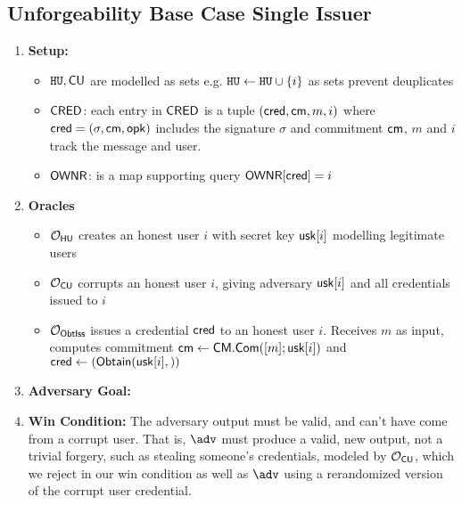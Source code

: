\subsection{Unforgeability Base Case Single Issuer}
\begin{enumerate}
    \item \textbf{Setup:}
    \begin{itemize}
        \item $\mathtt{HU}, \mathsf{CU}$ are modelled as sets e.g. $\mathtt{HU} \gets \mathtt{HU} \cup \{i\}$ as sets prevent deuplicates
        \item $\mathsf{CRED}$: each entry in $\mathsf{CRED}$ is a tuple $(\mathsf{cred}, \mathsf{cm}, m, i)$ where $\mathsf{cred} = (\sigma, \mathsf{cm}, \mathsf{opk})$ includes the signature $\sigma$ and commitment $\mathsf{cm}$, $m$ and $i$ track the message and user. 
        \item $\mathsf{OWNR}$: is a map supporting query $\mathsf{OWNR}[\mathsf{cred}] = i$
    \end{itemize}
    \item \textbf{Oracles}
    \begin{itemize}
        \item $\mathcal{O}_{\mathsf{HU}}$ creates an honest user $i$ with secret key $\mathsf{usk}[i]$ modelling legitimate users
        \item $\mathcal{O}_{\mathsf{CU}}$ corrupts an honest user $i$, giving adversary $\mathsf{usk}[i]$ and all credentials issued to $i$
        \item $\mathcal{O}_{\mathsf{ObtIss}}$ issues a credential $\mathsf{cred}$ to an honest user $i$. Receives $m$ as input, computes commitment $\mathsf{cm} \gets \mathsf{CM.Com}([m]; \mathsf{usk}[i])$ and $\mathsf{cred} \gets (\mathsf{Obtain}(\mathsf{usk}[i],))$
    \end{itemize}
    \item \textbf{Adversary Goal: } 
    \item \textbf{Win Condition: } The adversary output must be valid, and can't have come from a corrupt user. That is,
    $\adv$ must produce a valid, new output, not a trivial forgery, such as stealing someone's credentials, modeled by $\mathcal{O}_{\mathsf{CU}}$, which we reject in our win condition as well as $\adv$ using a rerandomized version of the corrupt user credential. 
\end{enumerate}

